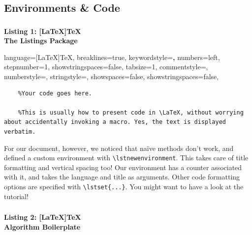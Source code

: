\documentclass[10pt]{article}
\theoremstyle{remark}
\begin{document}
	\subsection{Environments \& Code}

	
\subsubsection*{}
	\label{list:1}
	\begin{center}
		\textbf{\large Listing 1: [LaTeX]TeX}
		\\
		\textbf{\small The Listings Package}

	\end{center}


	{
	\lstset
	{
    language=[LaTeX]TeX,
    breaklines=true,
    keywordstyle=\color{blue}\textbf,
    numbers=left,
    stepnumber=1,
    showstringspaces=false,
    tabsize=1,
    commentstyle=\color{DarkGreen},
    numberstyle=\tiny\color{gray},
    stringstyle=\color{Maroon},
    showspaces=false,                
    showstringspaces=false,
	}
	} 
	{
	}
	
	\raggedright
	\begin{case}
	\begin{lstlisting}
	%Your code goes here.

	%This is usually how to present code in \LaTeX, without worrying about accidentally invoking a macro. Yes, the text is displayed verbatim.
	\end{lstlisting}
	\label{trickq}
	\end{case}



	For our document, however, we noticed that na\"ive methods don’t work, and defined a custom environment with \verb!\lstnewenvironment!. This takes care of title formatting and vertical spacing too! Our environment has a counter associated with it, and takes the language and title as arguments. Other code formatting options are specified with \verb!\lstset{...}!. You might want to have a look at the tutorial!


\clearpage
\subsubsection*{}
	\label{list:2}
	\begin{center}
		\textbf{\large Listing 2: [LaTeX]TeX}
		\\
		\normalsize
		\textbf{ Algorithm Boilerplate}

	\end{center}
\end{document}
